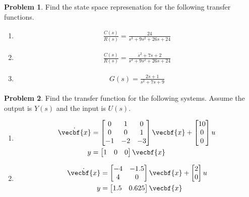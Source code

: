 \documentclass[10pt]{article}
\theoremstyle{definition}
\newtheorem{prob}{Problem}[section]
\newenvironment{subprob}%
{\renewcommand{\theenumi}{\alph{enumi}}\renewcommand{\labelenumi}{(\theenumi)}\begin{enumerate}}%
{\end{enumerate}}%
\begin{document}
\begin{prob}
   Find the  state space represenation for the following transfer functions.
   \begin{subprob}
        \item  
            \begin{align*}
                \frac{C(s)}{R(s)} = \frac{24}{s^3 + 9s^2 + 26s + 24}
            \end{align*}
        \item 
            \begin{align*}
                \frac{C(s)}{R(s)} = \frac{s^2 + 7s + 2}{s^3 + 9s^2 + 26s + 24}
            \end{align*}

        \item 
            \begin{align*}
                G(s) = \frac{2s + 1}{s^2 + 7s +9}
            \end{align*}
   \end{subprob}
\end{prob}

\clearpage\newpage
\begin{prob}
    Find the transfer function for the following systems.
    Assume the output is \( Y(s) \) and the input is \( U(s) \).

    \begin{subprob}
        \item 
            \begin{align*}
                \dot{\vecbf{x}} &= 
                \begin{bmatrix} 0 & 1 & 0 \\
                    0 & 0 & 1 \\
                    -1 & -2 & -3
                \end{bmatrix} \vecbf{x} +
                \begin{bmatrix} 10 \\ 0 \\ 0\end{bmatrix} u \\
                y &= \begin{bmatrix} 1 & 0 & 0 \end{bmatrix} \vecbf{x}
            \end{align*}
        \item 
            \begin{align*}
                \dot{\vecbf{x}} &= 
                \begin{bmatrix}-4 & -1.5 \\ 4 & 0\end{bmatrix} \vecbf{x} +
                \begin{bmatrix}2 \\ 0\end{bmatrix} u \\
                y &= \begin{bmatrix}1.5 & 0.625\end{bmatrix} \vecbf{x}
            \end{align*}
    \end{subprob}
\end{prob}
\end{document}
